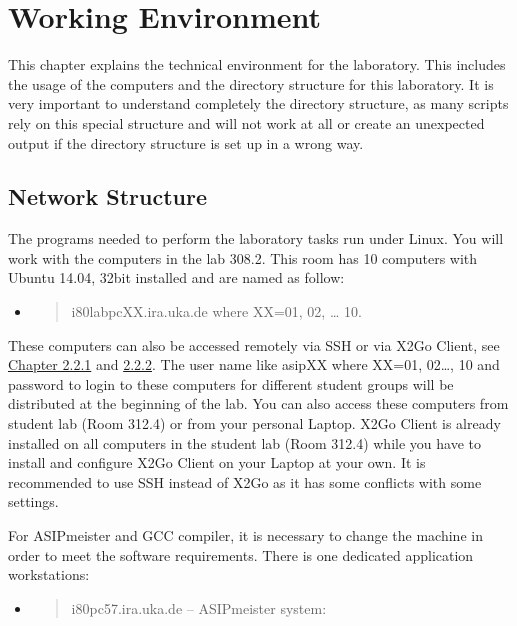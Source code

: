 \documentclass[
]{article}
\author{}
\date{}
\begin{document}
\hypertarget{working-environment}{%
\section{Working Environment}\label{working-environment}}

This chapter explains the technical environment for the laboratory. This
includes the usage of the computers and the directory structure for this
laboratory. It is very important to understand completely the directory
structure, as many scripts rely on this special structure and will not
work at all or create an unexpected output if the directory structure is
set up in a wrong way.

\hypertarget{network-structure}{%
\subsection{Network Structure}\label{network-structure}}

The programs needed to perform the laboratory tasks run under Linux. You
will work with the computers in the lab 308.2. This room has 10
computers with Ubuntu 14.04, 32bit installed and are named as follow:

\begin{itemize}
\item
  \begin{quote}
  i80labpcXX.ira.uka.de where XX=01, 02, \ldots{} 10.
  \end{quote}
\end{itemize}

These computers can also be accessed remotely via SSH or via X2Go
Client, see \protect\hyperlink{remote-operation}{Chapter 2.2.1} and
\protect\hyperlink{x2go-client}{2.2.2}. The user name like asipXX where
XX=01, 02\ldots, 10 and password to login to these computers for
different student groups will be distributed at the beginning of the
lab. You can also access these computers from student lab (Room 312.4)
or from your personal Laptop. X2Go Client is already installed on all
computers in the student lab (Room 312.4) while you have to install and
configure X2Go Client on your Laptop at your own. It is recommended to
use SSH instead of X2Go as it has some conflicts with some settings.

For ASIPmeister and GCC compiler, it is necessary to change the machine
in order to meet the software requirements. There is one dedicated
application workstations:

\begin{itemize}
\item
  \begin{quote}
  i80pc57.ira.uka.de -- ASIPmeister system:
  \end{quote}
\end{itemize}
\end{document}
